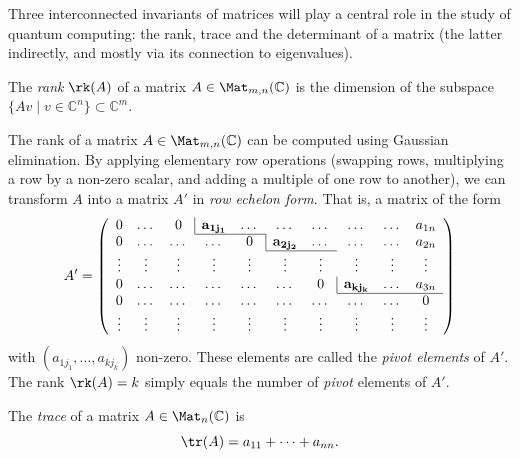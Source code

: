 \documentclass[a4paper,oneside, 12pt]{amsart}
\begin{document}
Three interconnected invariants of matrices will play a central role in the study of quantum computing: the rank, trace and the determinant of a matrix (the latter indirectly, and mostly via its connection to eigenvalues).

\begin{definition}\label{def:rank}
  The \emph{rank} \(\rk(A)\) of a matrix \(A \in \Mat_{m,n}(\mathbb{C})\) is the dimension of the subspace \(\{ Av \mid v\in \mathbb{C}^{n}\}\subset \mathbb{C}^{m}\).
\end{definition}

The rank of a matrix \( A \in \Mat_{m,n}(\mathbb{C}) \) can be computed using Gaussian elimination.
By applying elementary row operations (swapping rows, multiplying a row by a non-zero scalar, and adding a multiple of one row to another), we can transform \( A \) into a matrix \(A'\) in  \emph{row echelon form}.
That is, a matrix of the form
\begin{equation*}
  A' = \left(
    \begin{array}{cccccccccc}
      0 & \dots & 0 &\multicolumn{1}{|c}{\mathbf{a_{1j_{1}}}} & \dots  & \dots& \dots & \dots & \dots  & a_{1n} \\
      \cline{4-5}
      0 & \dots & \dots & \dots & 0 &  \multicolumn{1}{|c}{\mathbf{a_{2j_{2}}}} & \dots & \dots & \dots & a_{2n} \\
      \cline{6-7}
      \vdots & \vdots & \vdots & \vdots & \vdots & \vdots & \vdots & \vdots & \vdots  & \vdots\\
      0 & \dots & \dots & \dots & \dots & \dots &  0 & \multicolumn{1}{|c}{\mathbf{a_{kj_{k}}}} &\dots &  a_{3n} \\
      \cline{8-10}
      0 & \dots & \dots & \dots  & \dots & \dots & \dots & \dots & \dots & 0\\
      \vdots & \vdots & \vdots & \vdots & \vdots & \vdots & \vdots & \vdots & \vdots  & \vdots\\
    \end{array}
  \right)
\end{equation*}
with \((a_{1j_{1}}, \dots , a_{kj_{k}})\)  non-zero.
These elements are called the \emph{pivot elements} of \(A'\).
The rank \(\rk (A) = k\) simply equals the number of \emph{pivot} elements of \(A'\).


\begin{definition}\label{def:trace}
  The \emph{trace} of a matrix \(A\in \Mat_{n}( \mathbb{C})\) is
  \begin{equation}
    \tr(A)= a_{11}+ \dots + a_{nn}.
  \end{equation}
\end{definition}
\end{document}
